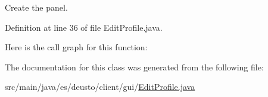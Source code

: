 Create the panel. 

Definition at line 36 of file Edit\+Profile.\+java.

Here is the call graph for this function\+:


The documentation for this class was generated from the following file\+:\begin{DoxyCompactItemize}
\item 
src/main/java/es/deusto/client/gui/\mbox{\hyperlink{_edit_profile_8java}{Edit\+Profile.\+java}}\end{DoxyCompactItemize}
